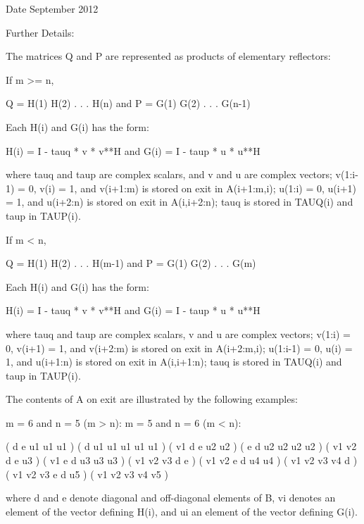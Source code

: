 \begin{DoxyDate}{Date}
September 2012 
\end{DoxyDate}
\begin{DoxyParagraph}{Further Details\+: }
\begin{DoxyVerb}  The matrices Q and P are represented as products of elementary
  reflectors:

  If m >= n,

     Q = H(1) H(2) . . . H(n)  and  P = G(1) G(2) . . . G(n-1)

  Each H(i) and G(i) has the form:

     H(i) = I - tauq * v * v**H  and G(i) = I - taup * u * u**H

  where tauq and taup are complex scalars, and v and u are complex
  vectors; v(1:i-1) = 0, v(i) = 1, and v(i+1:m) is stored on exit in
  A(i+1:m,i); u(1:i) = 0, u(i+1) = 1, and u(i+2:n) is stored on exit in
  A(i,i+2:n); tauq is stored in TAUQ(i) and taup in TAUP(i).

  If m < n,

     Q = H(1) H(2) . . . H(m-1)  and  P = G(1) G(2) . . . G(m)

  Each H(i) and G(i) has the form:

     H(i) = I - tauq * v * v**H  and G(i) = I - taup * u * u**H

  where tauq and taup are complex scalars, v and u are complex vectors;
  v(1:i) = 0, v(i+1) = 1, and v(i+2:m) is stored on exit in A(i+2:m,i);
  u(1:i-1) = 0, u(i) = 1, and u(i+1:n) is stored on exit in A(i,i+1:n);
  tauq is stored in TAUQ(i) and taup in TAUP(i).

  The contents of A on exit are illustrated by the following examples:

  m = 6 and n = 5 (m > n):          m = 5 and n = 6 (m < n):

    (  d   e   u1  u1  u1 )           (  d   u1  u1  u1  u1  u1 )
    (  v1  d   e   u2  u2 )           (  e   d   u2  u2  u2  u2 )
    (  v1  v2  d   e   u3 )           (  v1  e   d   u3  u3  u3 )
    (  v1  v2  v3  d   e  )           (  v1  v2  e   d   u4  u4 )
    (  v1  v2  v3  v4  d  )           (  v1  v2  v3  e   d   u5 )
    (  v1  v2  v3  v4  v5 )

  where d and e denote diagonal and off-diagonal elements of B, vi
  denotes an element of the vector defining H(i), and ui an element of
  the vector defining G(i).\end{DoxyVerb}
 
\end{DoxyParagraph}
\hypertarget{group__complexGEcomputational_ga9f4ec4d67a5ab8355936f6252defa8f5}{}
